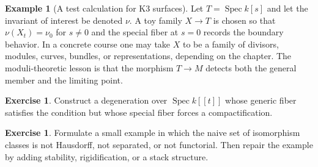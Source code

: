 \documentclass[11pt]{amsart}
\theoremstyle{definition}
\newtheorem{example}[theorem]{Example}
\newtheorem{exercise}[theorem]{Exercise}
\newcommand{\Spec}{\operatorname{Spec}}
\begin{document}
\begin{example}[A test calculation for K3 surfaces]
Let $T=\Spec k[s]$ and let the invariant of interest be denoted $\nu$.  A toy family $X\to T$ is chosen so that $\nu(X_t)=\nu_0$ for $s\ne0$ and the special fiber at $s=0$ records the boundary behavior.  In a concrete course one may take $X$ to be a family of divisors, modules, curves, bundles, or representations, depending on the chapter.  The moduli-theoretic lesson is that the morphism $T\to M$ detects both the general member and the limiting point.
\end{example}
\begin{exercise}
Construct a degeneration over $\Spec k[[t]]$ whose generic fiber satisfies the condition but whose special fiber forces a compactification.
\end{exercise}
\begin{exercise}
Formulate a small example in which the naive set of isomorphism classes is not Hausdorff, not separated, or not functorial.  Then repair the example by adding stability, rigidification, or a stack structure.
\end{exercise}
\clearpage
\end{document}
